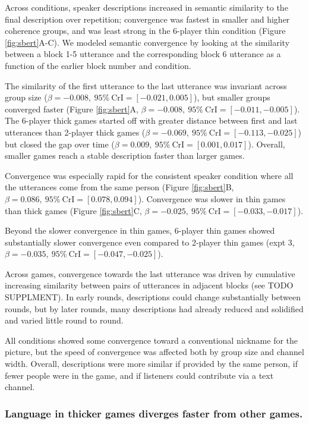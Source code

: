\documentclass[
  english,
  a4paper,
]{article}
\begin{document}
Across conditions, speaker descriptions increased in semantic similarity to the final description over repetition; convergence was fastest in smaller and higher coherence groups, and was least strong in the 6-player thin condition (Figure \ref{fig:sbert}A-C). We modeled semantic convergence by looking at the similarity between a block 1-5 utterance and the corresponding block 6 utterance as a function of the earlier block number and condition.

The similarity of the first utterance to the last utterance was invariant across group size (\(\beta=-0.008,\:95\%\:\mathrm{CrI}=[-0.021, 0.005]\)), but smaller groups converged faster (Figure \ref{fig:sbert}A, \(\beta=-0.008,\:95\%\:\mathrm{CrI}=[-0.011, -0.005]\)). The 6-player thick games started off with greater distance between first and last utterances than 2-player thick games (\(\beta=-0.069,\:95\%\:\mathrm{CrI}=[-0.113, -0.025]\)) but closed the gap over time (\(\beta=0.009,\:95\%\:\mathrm{CrI}=[0.001, 0.017]\)). Overall, smaller games reach a stable description faster than larger games.

Convergence was especially rapid for the consistent speaker condition where all the utterances come from the same person (Figure \ref{fig:sbert}B, \(\beta=0.086,\:95\%\:\mathrm{CrI}=[0.078, 0.094]\)). Convergence was slower in thin games than thick games (Figure \ref{fig:sbert}C, \(\beta=-0.025,\:95\%\:\mathrm{CrI}=[-0.033, -0.017]\)).

Beyond the slower convergence in thin games, 6-player thin games showed substantially slower convergence even compared to 2-player thin games (expt 3, \(\beta=-0.035,\:95\%\:\mathrm{CrI}=[-0.047, -0.025]\)).

Across games, convergence towards the last utterance was driven by cumulative increasing similarity between pairs of utterances in adjacent blocks (see TODO SUPPLMENT). In early rounds, descriptions could change substantially between rounds, but by later rounds, many descriptions had already reduced and solidified and varied little round to round.

All conditions showed some convergence toward a conventional nickname for the picture, but the speed of convergence was affected both by group size and channel width. Overall, descriptions were more similar if provided by the same person, if fewer people were in the game, and if listeners could contribute via a text channel.

\hypertarget{language-in-thicker-games-diverges-faster-from-other-games.}{%
\subsubsection{Language in thicker games diverges faster from other games.}\label{language-in-thicker-games-diverges-faster-from-other-games.}}
\end{document}
